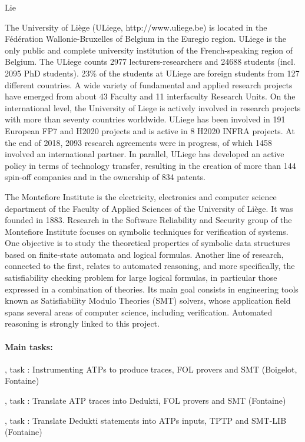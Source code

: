 \begin{sitedescription}{Lie}


The University of Liège (ULiege, http://www.uliege.be) is located in the Fédération Wallonie-Bruxelles of Belgium in the Euregio region. ULiege is the only public and complete university institution of the French-speaking region of Belgium. The ULiege counts 2977 lecturers-researchers and 24688 students (incl. 2095 PhD students). 23\% of the students at ULiege are foreign students from 127 different countries. A wide variety of fundamental and applied research projects have emerged from about 43 Faculty and 11 interfaculty Research Units. On the international level, the University of Liege is actively involved in research projects with more than seventy countries worldwide. ULiege has been involved in 191 European FP7 and H2020 projects and is active in 8 H2020 INFRA projects. At the end of 2018, 2093 research agreements were in progress, of which 1458 involved an international partner. In parallel, ULiege has developed an active policy in terms of technology transfer, resulting in the creation of more than 144 spin-off companies and in the ownership of 834 patents.

The Montefiore Institute is the electricity, electronics and computer science
department of the Faculty of Applied Sciences of the University of Liège.  It
was founded in 1883.  Research in the Software Reliability and Security group of
the Montefiore Institute focuses on symbolic techniques for verification of
systems.  One objective is to study the theoretical properties of symbolic data
structures based on finite-state automata and logical formulas.  Another line of
research, connected to the first, relates to automated reasoning, and more
specifically, the satisfiability checking problem for large logical formulas, in
particular those expressed in a combination of theories.  Its main goal consists
in engineering tools known as Satisfiability Modulo Theories (SMT) solvers,
whose application field spans several areas of computer science, including
verification.  Automated reasoning is strongly linked to this project.

\paragraph*{Main tasks:}

\begin{compactitem}
\item {}, task : Instrumenting ATPs to produce traces, FOL provers and SMT (Boigelot, Fontaine)
\item  {}, task : Translate ATP traces into Dedukti, FOL provers and SMT (Fontaine)
\item {}, task : Translate Dedukti statements into ATPs inputs, TPTP and SMT-LIB (Fontaine)
\end{compactitem}


\end{sitedescription}
